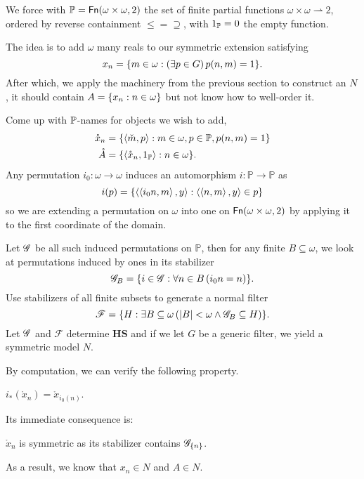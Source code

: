 We force with \(\mathbb{P} = \Fn(\omega\times\omega, 2)\)
the set of finite partial functions \(\omega\times\omega \rightharpoonup 2\),
ordered by reverse containment \(\leq = \supseteq\),
with \(1_\P = 0\) the empty function.

The idea is to add \(\omega\) many reals to our symmetric extension satisfying
\begin{equation} \label{basicCohen:property_x_n}
    x_n = \set{m\in\omega: \left(\exists p\in G\right) p(n,m) = 1}.
\end{equation}
After which, we apply the machinery from the previous section to construct an \(N\),
it should contain \( A = \set{x_n:n\in \omega } \) but not know how to well-order it.

Come up with \(\P\)-names for objects we wish to add,
\begin{align*}
    \mathring{x}_n &= \set{\Angle{\check{m},p}: m\in\omega, p\in\P,p(n,m) = 1} \\
    \mathring{A} &= \set{\Angle{\mathring{x}_n,1_\P}: n\in\omega}.
\end{align*}
Any permutation \(i_0: \omega \to \omega\) induces an automorphism \(i: \mathbb{P}\to\mathbb{P}\) as
\[ i(p) = \set{\Angle{\Angle{i_0 n, m}, y}: \Angle{\Angle{n,m},y} \in p} \]
so we are extending a permutation on \(\omega\) into one on \(\Fn(\omega\times\omega, 2)\)
by applying it to the first coordinate of the domain.

Let \(\G\) be all such induced permutations on \(\mathbb{P}\), then for any finite \(B\subseteq \omega\),
we look at permutations induced by ones in its stabilizer
\[ \G_B = \set{ i\in \G: \forall n\in B\left( i_0 n = n \right) }. \]
Use stabilizers of all finite subsets to generate a normal filter
\[ \mathscr{F} = \set{H: \exists B\subseteq \omega \left(\abs{B}<\omega \land \G_B \subseteq H\right) }. \]
Let \(\G\) and \(\mathscr{F}\) determine \(\mathbf{HS}\) and if we let \(G\) be a generic filter, we yield a symmetric model \(N\).

By computation, we can verify the following property.
\begin{proposition}
    \(i_* (\mathring{x}_n) = \mathring{x}_{i_0(n)} \).
\end{proposition}
Its immediate consequence is:
\begin{corollary}
    \(\mathring{x}_n\) is symmetric as its stabilizer contains \(\G_\set{n}\).
\end{corollary}
As a result, we know that \(x_n\in N\) and \(A\in N\).

